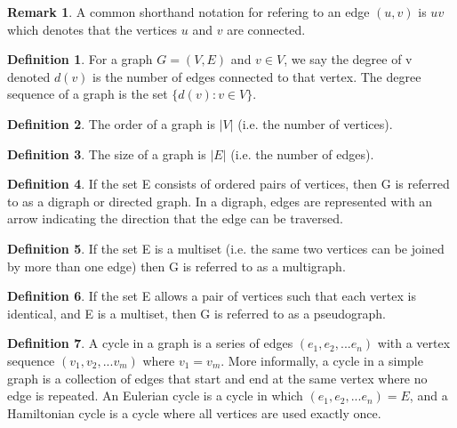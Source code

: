 \documentclass[11pt,reqno]{amsart}
\theoremstyle{definition}
\newtheorem{definition}{Definition}
\newtheorem{remark}[thm]{Remark}
\numberwithin{equation}{section}
\begin{document}
	\begin{remark}
		A common shorthand notation for refering to an edge $(u,v)$ is $uv$ which denotes that the vertices $u$ and $v$ are connected.
	\end{remark}

	\begin{definition}\label{degree}
		For a graph $G=(V,E)$ and $v \in V$, we say the degree of v denoted $d(v)$ is the number of edges connected to that vertex. The degree sequence of a graph is the set $\{d(v): v\in V\}$.\\
	\end{definition}

	\begin{definition}\label{degree}
		The order of a graph is $|V|$ (i.e. the number of vertices). 
	\end{definition}

	\begin{definition}\label{degree}
		The size of a graph is $|E|$ (i.e. the number of edges).
	\end{definition}

	\begin{definition}
		If the set E consists of ordered pairs of vertices, then G is referred to as a digraph or directed graph. In a digraph, edges are represented with an arrow indicating the direction that the edge can be traversed.
	\end{definition}

	\begin{definition}
		If the set E is a multiset (i.e. the same two vertices can be joined by more than one edge) then G is referred to as a multigraph.
	\end{definition}
		
	\begin{definition}
		If the set E allows a pair of vertices such that each vertex is identical, and E is a multiset, then G is referred to as a pseudograph.
	\end{definition}

\begin{definition}
	A cycle in a graph is a series of edges $(e_1, e_2, ... e_n)$ with a vertex sequence $(v_1,v_2,...v_m)$ where $v_1=v_m$. More informally, a cycle in a simple graph is a collection of edges that start and end at the same vertex where no edge is repeated. An Eulerian cycle is a cycle in which $(e_1,e_2,...e_n)=E$, and a Hamiltonian cycle is a cycle where all vertices are used exactly once.
\end{definition}
		
\end{document}
